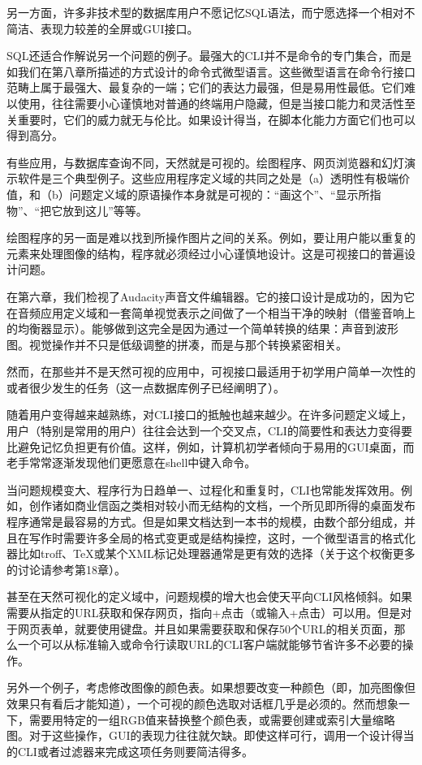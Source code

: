 \documentclass[12pt,oneside]{ctexbook}
\begin{document}
\begin{common-format}
另一方面，许多非技术型的数据库用户不愿记忆SQL语法，而宁愿选择一个相对不简洁、表现力较差的全屏或GUI接口。

SQL还适合作解说另一个问题的例子。最强大的CLI并不是命令的专门集合，而是如我们在第八章所描述的方式设计的命令式微型语言。这些微型语言在命令行接口范畴上属于最强大、最复杂的一端；它们的表达力最强，但是易用性最低。它们难以使用，往往需要小心谨慎地对普通的终端用户隐藏，但是当接口能力和灵活性至关重要时，它们的威力就无与伦比。如果设计得当，在脚本化能力方面它们也可以得到高分。

有些应用，与数据库查询不同，天然就是可视的。绘图程序、网页浏览器和幻灯演示软件是三个典型例子。这些应用程序定义域的共同之处是（a）透明性有极端价值，和（b）问题定义域的原语操作本身就是可视的：“画这个”、“显示所指物”、“把它放到这儿”等等。

绘图程序的另一面是难以找到所操作图片之间的关系。例如，要让用户能以重复的元素来处理图像的结构，程序就必须经过小心谨慎地设计。这是可视接口的普遍设计问题。

在第六章，我们检视了Audacity声音文件编辑器。它的接口设计是成功的，因为它在音频应用定义域和一套简单视觉表示之间做了一个相当干净的映射（借鉴音响上的均衡器显示）。能够做到这完全是因为通过一个简单转换的结果：声音到波形图。视觉操作并不只是低级调整的拼凑，而是与那个转换紧密相关。

然而，在那些并不是天然可视的应用中，可视接口最适用于初学用户简单一次性的或者很少发生的任务（这一点数据库例子已经阐明了）。

随着用户变得越来越熟练，对CLI接口的抵触也越来越少。在许多问题定义域上，用户（特别是常用的用户）往往会达到一个交叉点，CLI的简要性和表达力变得要比避免记忆负担更有价值。这样，例如，计算机初学者倾向于易用的GUI桌面，而老手常常逐渐发现他们更愿意在shell中键入命令。

当问题规模变大、程序行为日趋单一、过程化和重复时，CLI也常能发挥效用。例如，创作诸如商业信函之类相对较小而无结构的文档，一个所见即所得的桌面发布程序通常是最容易的方式。但是如果文档达到一本书的规模，由数个部分组成，并且在写作时需要许多全局的格式变更或是结构操控，这时，一个微型语言的格式化器比如troff、TeX或某个XML标记处理器通常是更有效的选择（关于这个权衡更多的讨论请参考第18章）。

甚至在天然可视化的定义域中，问题规模的增大也会使天平向CLI风格倾斜。如果需要从指定的URL获取和保存网页，指向+点击（或输入+点击）可以用。但是对于网页表单，就要使用键盘。并且如果需要获取和保存50个URL的相关页面，那么一个可以从标准输入或命令行读取URL的CLI客户端就能够节省许多不必要的操作。

另外一个例子，考虑修改图像的颜色表。如果想要改变一种颜色（即，加亮图像但效果只有看后才能知道），一个可视的颜色选取对话框几乎是必须的。然而想象一下，需要用特定的一组RGB值来替换整个颜色表，或需要创建或索引大量缩略图。对于这些操作，GUI的表现力往往就欠缺。即使这样可行，调用一个设计得当的CLI或者过滤器来完成这项任务则要简洁得多。


\end{common-format}
\end{document}
